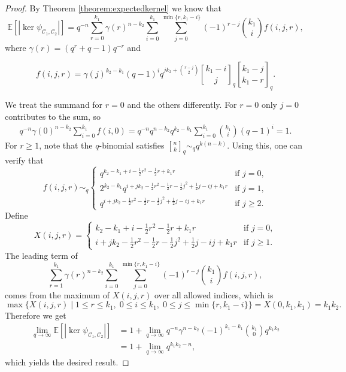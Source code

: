 \documentclass[a4paper,11pt,reqno]{article}
\newcommand{\E}{\mathbb E}
\newcommand{\C}{\mathcal{C}}
\newcommand{\qbinom}[2]{\genfrac[]{0pt}{0}{#1}{#2}}
\theoremstyle{plain} \numberwithin{equation}{section}
\theoremstyle{definition}
\begin{document}
\begin{proof}
By Theorem \ref{theorem:expectedkernel} we know that
$$\E[ |\ker \psi_{\C_1, \C_2}|] = q^{-n} \sum_{r=0}^{k_1} \gamma(r)^{n-k_2}\sum_{i=0}^{k_1} \sum_{j=0}^{\min\{r, k_1-i\}} (-1)^{r-j}\binom{k_1}{i}f(i,j,r),$$
where $\gamma(r) =(q^r+q-1)q^{-r}$ and 

$$f(i,j,r) = \gamma(j)^{k_2-k_1}(q-1)^iq^{jk_2 + \binom{r-j}{2}}\qbinom{k_1-i}{j}_q\qbinom{k_1-j}{k_1-r}_q.$$

We treat the summand for $r=0$ and the others differently.  For $r=0$ only $j=0$ contributes to the sum, so
\begin{align*}
   q^{-n} \gamma(0)^{n-k_2}\sum_{i=0}^{k_1} f(i,0) =  q^{-n} q^{n-k_2} q^{k_2 - k_1}\sum_{i=0}^{k_1} \binom{k_1}{i}(q-1)^i = 1.
\end{align*}
For $r \ge 1$, note that the $q$-binomial satisfies $\qbinom{n}{k}_q\sim_q q^{k(n-k)}$. Using this, one can verify that
$$f(i,j,r) \sim_q \begin{cases}
    q^{k_2 - k_1 + i - \frac{1}{2}r^2 - \frac{1}{2}r + k_1r} & \text{if } j=0,\\
    2^{k_2-k_1} q^{i+jk_2 - \frac{1}{2}r^2 -\frac{1}{2}r - \frac{1}{2}j^2 + \frac{1}{2}j - ij +k_1r} & \text{if } j = 1, \\ 
    q^{i+jk_2 - \frac{1}{2}r^2 -\frac{1}{2}r - \frac{1}{2}j^2 + \frac{1}{2}j - ij +k_1r} & \text{if } j \geq 2.
\end{cases}$$
Define
$$X(i,j,r) =\begin{cases} k_2 - k_1 + i - \frac{1}{2}r^2 - \frac{1}{2}r + k_1r & \text{if } j=0,\\
i+jk_2 - \frac{1}{2}r^2 -\frac{1}{2}r - \frac{1}{2}j^2 + \frac{1}{2}j - ij +k_1r & \text{if } j \geq 1.\end{cases}$$
The leading term  of
$$\sum_{r=1}^{k_1} \gamma(r)^{n-k_2}\sum_{i=0}^{k_1} \sum_{j=0}^{\min\{r, k_1-i\}} (-1)^{r-j}\binom{k_1}{i}f(i,j,r),$$
comes from the maximum of $X(i,j,r)$ over all allowed indices, which is
$$\max\big\{ X(i,j,r)\mid 1\leq r \leq k_1,\; 0\leq i \leq k_1, \; 0\leq j \leq \min\{r,k_1-i\}\big \} = X(0,k_1,k_1) = k_1k_2.$$
Therefore we get 
\begin{align*}
    \lim_{q \rightarrow \infty} \E[|\ker \psi_{\C_1, \C_2}|] &= 1 + \lim_{q \rightarrow \infty} q^{-n} \gamma^{n-k_2} (-1)^{k_1-k_1} \binom{k_1}{0} q^{k_1k_2}\\
    &= 1 + \lim_{q \rightarrow \infty} q^{k_1k_2 -n}, 
\end{align*}
which yields the desired result. 
\end{proof}
\end{document}
